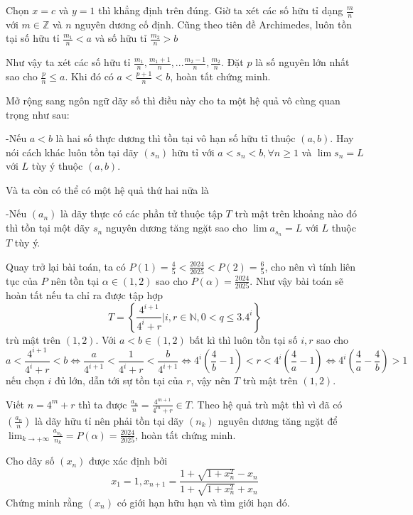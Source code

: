 \documentclass[11pt]{scrartcl}
\begin{document}
\begin{itemize}[label=, leftmargin=0em, itemsep=0.5em]
\begin{sol}
        Chọn $x = c$ và $y = 1$ thì khẳng định trên đúng. Giờ ta xét các số hữu tỉ dạng $\frac{m}{n}$ với $m \in \mathbb{Z}$ và $n$ nguyên dương cố định. Cũng theo tiên đề Archimedes, luôn tồn tại số hữu tỉ $\frac{m_1}{n} < a$  và số hữu tỉ $\frac{m_2}{n} > b$


        Như vậy ta xét các số hữu tỉ $\frac{m_1}{n}, \frac{m_1 + 1}{n},...\frac{m_2 - 1}{n},\frac{m_2}{n}$. Đặt $p$ là số nguyên lớn nhất sao cho $\frac{p}{n} \leq a$. Khi đó có $a < \frac{p + 1}{n} < b$, hoàn tất chứng minh.


        Mở rộng sang ngôn ngữ dãy số thì điều này cho ta một hệ quả vô cùng quan trọng như sau: 
        \begin{theo}[Hệ quả 1]
            -Nếu $a < b$ là hai số thực dương thì tồn tại vô hạn số hữu tỉ thuộc $(a,b)$. Hay nói cách khác luôn tồn tại dãy $(s_n)$ hữu tỉ với $a < s_n < b, \forall n \geq 1$ và $\lim s_n = L$ với $L$ tùy ý thuộc $(a,b)$.
        \end{theo}
        Và ta còn có thể có một hệ quả thứ hai nữa là
        \begin{theo}[Hệ quả 2]
            -Nếu $(a_n)$ là dãy thực có các phần tử thuộc tập $T$ trù mật trên khoảng nào đó thì tồn tại một dãy $s_n$ nguyên dương tăng ngặt sao cho $\lim a_{s_n} = L$ với $L$ thuộc $T$ tùy ý.
        \end{theo}
        Quay trở lại bài toán, ta có $P(1) = \frac{4}{5} < \frac{2024}{2025} < P(2) = \frac{6}{5}$, cho nên vì tính liên tục của $P$ nên tồn tại $\alpha \in (1,2)$ sao cho $P(\alpha) = \frac{2024}{2025}$. Như vậy bài toán sẽ hoàn tất nếu ta chỉ ra được tập hợp 
        \[T = \left\{\frac{4^{i + 1}}{4^i + r} | i,r \in \mathbb{N}, 0 < q \leq 3.4^i\right\}\]
        trù mật trên $(1,2)$. Với $a < b \in (1,2)$ bất kì thì luôn tồn tại số $i,r$ sao cho $$ a < \frac{4^{i + 1}}{4^i + r} < b \Leftrightarrow \frac{a}{4^{i + 1}} < \frac{1}{4^i + r} < \frac{b}{4^{i + 1}} \Leftrightarrow 4^i(\frac{4}{b} - 1) < r < 4^i(\frac{4}{a} - 1) \Leftrightarrow 4^i(\frac{4}{a} - \frac{4}{b}) > 1$$  nếu chọn $i$ đủ lớn, dẫn tới sự tồn tại của $r$, vậy nên $T$ trù mật trên $(1,2)$. 

        
        
        Viết $n = 4^m + r$ thì ta được $\frac{a_n}{n} = \frac{4^{m + 1}}{4^m + r} \in T$. Theo hệ quả trù mật thì vì đã có $\left(\frac{a_n}{n}\right)$ là dãy hữu tỉ nên phải tồn tại dãy $(n_k)$ nguyên dương tăng ngặt để $\displaystyle \lim_{k \to +\infty}\frac{a_{n_k}}{n_k} = P(\alpha) = \frac{2024}{2025}$, hoàn tất chứng minh.
    \end{sol}
    \begin{bt}
        Cho dãy số $(x_n)$ được xác định bởi $$x_1 = 1, x_{n + 1} = \frac{1 + \sqrt{1 + x_n^2} - x_n}{1 + \sqrt{ 1 + x_n^2} + x_n}$$Chứng minh rằng $(x_n)$ có giới hạn hữu hạn và tìm giới hạn đó.
    \end{bt}


\end{itemize}
\end{document}
